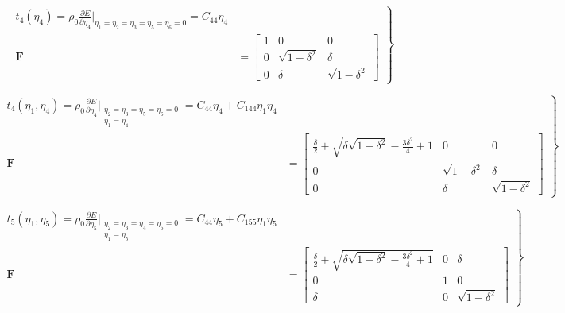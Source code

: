 \documentclass[showpacs,aps,floatfix,prb,reprint,superscriptaddress,onecolumn]{revtex4-1}
\begin{document}
\begin{equation}
\label{eqn:SM-hexs4}
  \left.\begin{aligned}
        t_{4} \left(\eta_{4}\right) = \rho_{0} \frac{\partial E}{\partial \eta_{4}}\Bigr|_{\eta_1=\eta_2=\eta_3=\eta_5=\eta_6=0} = C_{44}\eta_{4} \\
        \bm{F}&=\begin{bmatrix} 1 & 0 & 0 \\ 0 & \sqrt{1-\delta^2} & \delta \\ 0 & \delta & \sqrt{1-\delta^2} \end{bmatrix}
       \end{aligned}
			\right\}
\end{equation}


\begin{equation}
\label{eqn:SM-hexs5}
  \left.\begin{aligned}
        t_{4} \left(\eta_{1}, \eta_{4}\right) = \rho_{0} \frac{\partial E}{\partial \eta_{4}}\Bigr|_{\substack{\eta_2=\eta_3=\eta_5=\eta_6=0 \\ \eta_{1} = \eta_{4}}} = C_{44}\eta_{4} + C_{144}\eta_{1}\eta_{4} \\
        \bm{F}&=\begin{bmatrix} \frac{\delta}{2}+\sqrt{\delta \sqrt{1-\delta^2}-\frac{3 \delta^2}{4}+1} & 0 & 0 \\ 0 & \sqrt{1-\delta^2} & \delta \\ 0 & \delta & \sqrt{1-\delta^2} \end{bmatrix}
       \end{aligned}
			\right\}
\end{equation}


\begin{equation}
\label{eqn:SM-hexs6}
  \left.\begin{aligned}
        t_{5} \left(\eta_{1}, \eta_{5}\right) = \rho_{0} \frac{\partial E}{\partial \eta_{5}}\Bigr|_{\substack{\eta_2=\eta_3=\eta_4=\eta_6=0 \\ \eta_{1} = \eta_{5}}} = C_{44}\eta_{5} + C_{155}\eta_{1}\eta_{5} \\
        \bm{F}&=\begin{bmatrix} \frac{\delta}{2}+\sqrt{\delta \sqrt{1-\delta^2}-\frac{3 \delta^2}{4}+1} & 0 & \delta \\ 0 & 1 & 0 \\ \delta & 0 & \sqrt{1-\delta^2} \end{bmatrix}
       \end{aligned}
			\right\}
\end{equation}
\end{document}
